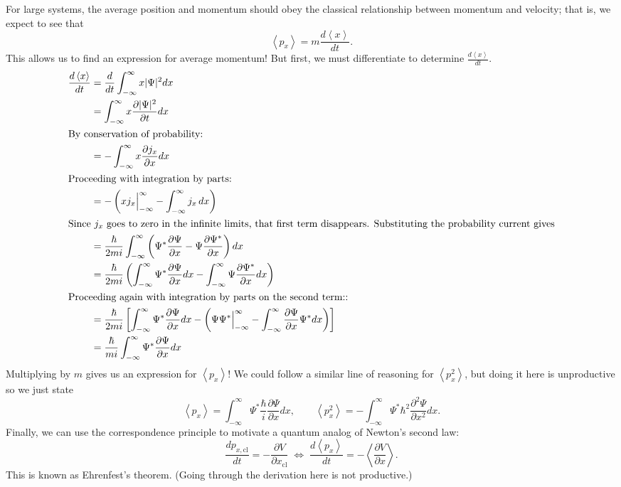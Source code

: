 \documentclass[../p052main.tex]{subfiles}
\begin{document}
For large systems, the average position and momentum should obey the classical relationship between momentum and velocity; that is, we expect to see that
\[ \left< p_x \right> = m \frac{d \left< x \right>}{dt}. \]
This allows us to find an expression for average momentum!
But first, we must differentiate to determine $\frac{d \left< x \right>}{dt}$.
\begin{align*}
    \frac{d\left< x \right>}{dt} &= \frac{d}{dt} \int_{-\infty}^{\infty} x |\Psi|^2 dx \\
    &= \int_{-\infty}^{\infty} x \frac{\partial |\Psi|^2}{\partial t}dx \\
    \intertext{By conservation of probability:}
    &= -\int_{-\infty}^{\infty} x \frac{\partial j_x}{\partial x} dx \\
    \intertext{Proceeding with integration by parts:}
    &= -\left( x j_x \Big|_{-\infty}^\infty - \int_{-\infty}^{\infty} j_x \,dx \right) \\
    \intertext{Since $j_x$ goes to zero in the infinite limits, that first term disappears. Substituting the probability current gives}
    &= \frac{\hbar}{2mi} \int_{-\infty}^{\infty} \left( \Psi^* \frac{\partial \Psi}{\partial x} - \Psi \frac{\partial \Psi^*}{\partial x} \right) dx \\
    &= \frac{\hbar}{2mi} \left( \int_{-\infty}^{\infty} \Psi^* \frac{\partial \Psi}{\partial x} dx - \int_{-\infty}^{\infty} \Psi \frac{\partial \Psi^*}{\partial x} dx \right) \\
    \intertext{Proceeding again with integration by parts on the second term::}
    &= \frac{\hbar}{2mi} \left[ \int_{-\infty}^{\infty} \Psi^* \frac{\partial \Psi}{\partial x} dx - \left( \Psi \Psi^* \Big|_{-\infty}^\infty - \int_{-\infty}^{\infty} \frac{\partial \Psi}{\partial x} \Psi^* dx \right) \right] \\
    &= \frac{\hbar}{mi} \int_{-\infty}^\infty \Psi^* \frac{\partial \Psi}{\partial x} dx
\end{align*}
Multiplying by $m$ gives us an expression for $\left< p_x \right>$!
We could follow a similar line of reasoning for $\left< p_x^2 \right>$, but doing it here is unproductive so we just state
\[ \left< p_x \right> = \int_{-\infty}^\infty \Psi^* \frac{\hbar}{i} \frac{\partial \Psi}{\partial x} dx, \qquad \left< p_x^2 \right> = -\int_{-\infty}^\infty \Psi^* \hbar^2 \frac{\partial^2 \Psi}{\partial x^2} dx. \]
Finally, we can use the correspondence principle to motivate a quantum analog of Newton's second law:
\[ \frac{dp_{x,\textrm{cl}}}{dt} = -\frac{\partial V}{\partial x_\textrm{cl}} \;\Longleftrightarrow\; \frac{d \left< p_x \right>}{dt} = -\left< \frac{\partial V}{\partial x} \right>. \]
This is known as Ehrenfest's theorem.
(Going through the derivation here is not productive.)
\end{document}
